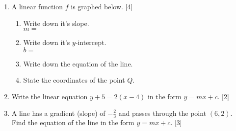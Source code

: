 \documentclass[12pt, twoside]{article}
\begin{document}
\begin{enumerate}
\newpage
\item A linear function $f$ is graphed below. \hfill [4]
\begin{multicols}{2}
\begin{enumerate}
  \item Write down it's slope.\\ $m=$
  \vspace{0.25cm}
  \item Write down it's $y$-intercept.\\ $b=$
  \vspace{0.25cm}
  \item Write down the equation of the line.
  \vspace{1cm}
  \item State the coordinates of the point $Q$.
\end{enumerate} \vspace{.5cm}
  \begin{center} 
  \end{center}
\end{multicols}

\item Write the linear equation $y+5=2(x-4)$ in the form $y=mx+c$.  \hfill [2]\vspace{4cm}

\item A line has a gradient (slope) of $\displaystyle -\frac{2}{3}$ and passes through the point $(6, 2)$. Find the equation of the line in the form $y=mx+c$. \hfill [3]


\end{enumerate}
\end{document}
